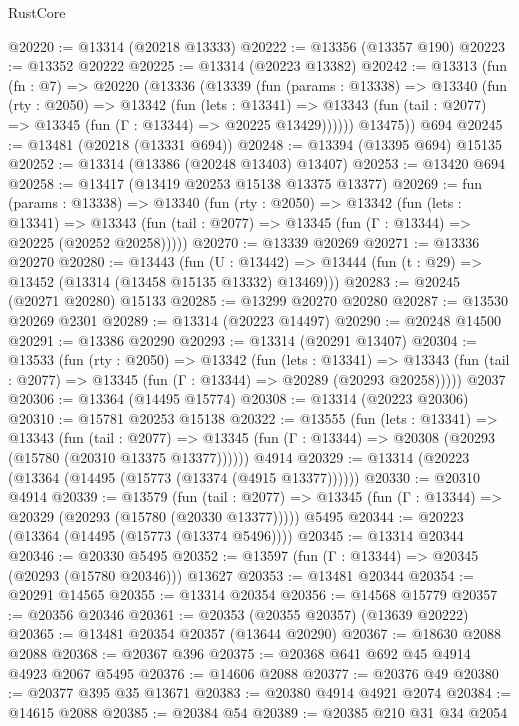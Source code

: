 \begin{lexlean}{RustCore}
\begin{coremodule}
@20220 := @13314 (@20218 @13333)
@20222 := @13356 (@13357 @190)
@20223 := @13352 @20222
@20225 := @13314 (@20223 @13382)
@20242 := @13313
    (fun (fn : @7) =>
    @20220
      (@13336
        (@13339
          (fun (params : @13338) =>
          @13340
            (fun (rty : @2050) =>
            @13342
              (fun (lets : @13341) =>
              @13343 (fun (tail : @2077) => @13345 (fun (Γ : @13344) => @20225 @13429))))))
        @13475))
    @694
@20245 := @13481 (@20218 (@13331 @694))
@20248 := @13394 (@13395 @694) @15135
@20252 := @13314 (@13386 (@20248 @13403) @13407)
@20253 := @13420 @694
@20258 := @13417 (@13419 @20253 @15138 @13375 @13377)
@20269 := fun (params : @13338) =>
  @13340
    (fun (rty : @2050) =>
    @13342
      (fun (lets : @13341) =>
      @13343 (fun (tail : @2077) => @13345 (fun (Γ : @13344) => @20225 (@20252 @20258)))))
@20270 := @13339 @20269
@20271 := @13336 @20270
@20280 := @13443
    (fun (U : @13442) => @13444 (fun (t : @29) => @13452 (@13314 (@13458 @15135 @13332) @13469)))
@20283 := @20245 (@20271 @20280) @15133
@20285 := @13299 @20270 @20280
@20287 := @13530 @20269 @2301
@20289 := @13314 (@20223 @14497)
@20290 := @20248 @14500
@20291 := @13386 @20290
@20293 := @13314 (@20291 @13407)
@20304 := @13533
    (fun (rty : @2050) =>
    @13342
      (fun (lets : @13341) =>
      @13343 (fun (tail : @2077) => @13345 (fun (Γ : @13344) => @20289 (@20293 @20258)))))
    @2037
@20306 := @13364 (@14495 @15774)
@20308 := @13314 (@20223 @20306)
@20310 := @15781 @20253 @15138
@20322 := @13555
    (fun (lets : @13341) =>
    @13343
      (fun (tail : @2077) =>
      @13345 (fun (Γ : @13344) => @20308 (@20293 (@15780 (@20310 @13375 @13377))))))
    @4914
@20329 := @13314 (@20223 (@13364 (@14495 (@15773 (@13374 (@4915 @13377))))))
@20330 := @20310 @4914
@20339 := @13579
    (fun (tail : @2077) => @13345 (fun (Γ : @13344) => @20329 (@20293 (@15780 (@20330 @13377)))))
    @5495
@20344 := @20223 (@13364 (@14495 (@15773 (@13374 @5496))))
@20345 := @13314 @20344
@20346 := @20330 @5495
@20352 := @13597 (fun (Γ : @13344) => @20345 (@20293 (@15780 @20346))) @13627
@20353 := @13481 @20344
@20354 := @20291 @14565
@20355 := @13314 @20354
@20356 := @14568 @15779
@20357 := @20356 @20346
@20361 := @20353 (@20355 @20357) (@13639 @20222)
@20365 := @13481 @20354 @20357 (@13644 @20290)
@20367 := @18630 @2088 @2088
@20368 := @20367 @396
@20375 := @20368 @641 @692 @45 @4914 @4923 @2067 @5495
@20376 := @14606 @2088
@20377 := @20376 @49
@20380 := @20377 @395 @35 @13671
@20383 := @20380 @4914 @4921 @2074
@20384 := @14615 @2088
@20385 := @20384 @54
@20389 := @20385 @210 @31 @34 @2054

\end{coremodule}
\end{lexlean}
